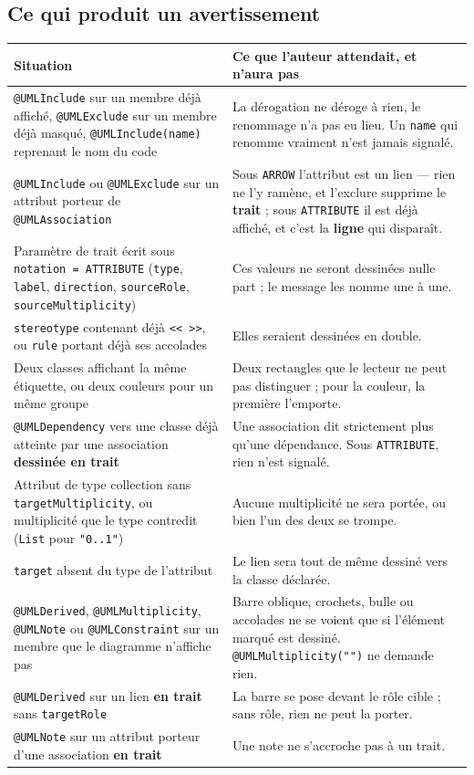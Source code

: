 \documentclass[12pt, a4paper]{article}
\begin{document}
\subsection{Ce qui produit un avertissement}
\begin{longtable}{@{}L{6.6cm}L{10.0cm}@{}}
\hline
\textbf{Situation} & \textbf{Ce que l'auteur attendait, et n'aura pas} \\
\hline
\endhead
\texttt{@UMLInclude} sur un membre déjà affiché, \texttt{@UMLExclude} sur un membre déjà masqué, \texttt{@UMLInclude(name)} reprenant le nom du code & La dérogation ne déroge à rien, le renommage n'a pas eu lieu. Un \texttt{name} qui renomme vraiment n'est jamais signalé. \\
\texttt{@UMLInclude} ou \texttt{@UMLExclude} sur un attribut porteur de \texttt{@UMLAssociation} & Sous \texttt{ARROW} l'attribut est un lien --- rien ne l'y ramène, et l'exclure supprime le \textbf{trait} ; sous \texttt{ATTRIBUTE} il est déjà affiché, et c'est la \textbf{ligne} qui disparaît. \\
Paramètre de trait écrit sous \texttt{notation = ATTRIBUTE} (\texttt{type}, \texttt{label}, \texttt{direction}, \texttt{sourceRole}, \texttt{sourceMultiplicity}) & Ces valeurs ne seront dessinées nulle part ; le message les nomme une à une. \\
\texttt{stereotype} contenant déjà \texttt{<<~>>}, ou \texttt{rule} portant déjà ses accolades & Elles seraient dessinées en double. \\
Deux classes affichant la même étiquette, ou deux couleurs pour un même groupe & Deux rectangles que le lecteur ne peut pas distinguer ; pour la couleur, la première l'emporte. \\
\texttt{@UMLDependency} vers une classe déjà atteinte par une association \textbf{dessinée en trait} & Une association dit strictement plus qu'une dépendance. Sous \texttt{ATTRIBUTE}, rien n'est signalé. \\
Attribut de type collection sans \texttt{targetMultiplicity}, ou multiplicité que le type contredit (\texttt{List} pour \texttt{"0..1"}) & Aucune multiplicité ne sera portée, ou bien l'un des deux se trompe. \\
\texttt{target} absent du type de l'attribut & Le lien sera tout de même dessiné vers la classe déclarée. \\
\texttt{@UMLDerived}, \texttt{@UMLMultiplicity}, \texttt{@UMLNote} ou \texttt{@UMLConstraint} sur un membre que le diagramme n'affiche pas & Barre oblique, crochets, bulle ou accolades ne se voient que si l'élément marqué est dessiné. \texttt{@UMLMultiplicity("")} ne demande rien. \\
\texttt{@UMLDerived} sur un lien \textbf{en trait} sans \texttt{targetRole} & La barre se pose devant le rôle cible ; sans rôle, rien ne peut la porter. \\
\texttt{@UMLNote} sur un attribut porteur d'une association \textbf{en trait} & Une note ne s'accroche pas à un trait. \\
\hline
\end{longtable}
\end{document}

